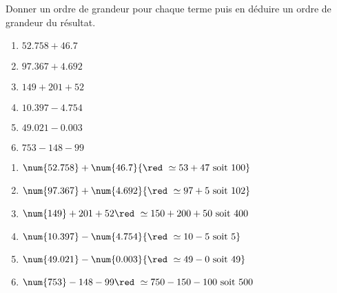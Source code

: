 \begin{exercice*}
    Donner un ordre de grandeur pour chaque terme puis en déduire un ordre de grandeur du résultat.
    \begin{multicols}{2}
        \begin{spacing}{1.5}
            \begin{enumerate}
                \item $\num{52.758}   + \num{46.7}$
                \item $\num{97.367}   + \num{4.692}$
                \item $\num{149   }   + 201 + 52$
                \item $\num{10.397}   - \num{4.754}$
                \item $\num{49.021}   - \num{0.003}$
                \item $\num{753   }   - 148 - 99$
            \end{enumerate}
        \end{spacing}
    \end{multicols}
 \end{exercice*}
 \begin{corrige}
    \begin{enumerate}
        \item $\num{52.758}   + \num{46.7}  {\red ~\simeq 53 + 47        \text{ soit 100}}$
        \item $\num{97.367}   + \num{4.692} {\red ~\simeq 97 + 5         \text{ soit 102}}$
        \item $\num{149   }   + 201 + 52    {\red ~\simeq 150 + 200 + 50 \text{ soit 400}}$
        \item $\num{10.397}   - \num{4.754} {\red ~\simeq 10 - 5         \text{ soit 5}}$
        \item $\num{49.021}   - \num{0.003} {\red ~\simeq 49 - 0         \text{ soit 49}}$
        \item $\num{753   }   - 148 - 99    {\red ~\simeq 750 - 150 -100 \text{ soit 500}}$
    \end{enumerate}
 \end{corrige}